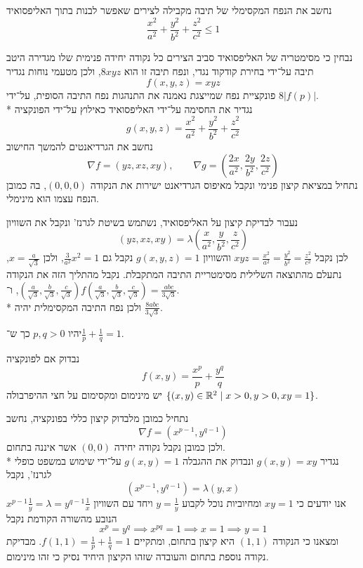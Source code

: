 \Question{}
נחשב את הנפח המקסימלי של תיבה מקבילה לצירים שאפשר לבנות בתוך האליפסואיד
\[
	\frac{x^2}{a^2} + \frac{y^2}{b^2} + \frac{z^2}{c^2} \le 1
\]

נבחין כי מסימטריה של האליפסואיד סביב הצירים כל נקודה יחידה פנימית שלו מגדירה היטב תיבה על־ידי בחירת קודקוד נגדי, ונפח תיבה זו הוא $8xyz$, ולכן מטעמי נוחות נגדיר
\[
	f(x, y, z) = xyz
\]
פונקציית נפח שמייצגת נאמנה את התנהגות נפח התיבה הסופית, על־ידי $8|f(p)|$. \\*
נגדיר את החסימה על־ידי האליפסואיד כאילוץ על־ידי הפונקציה
\[
	g(x, y, z) = \frac{x^2}{a^2} + \frac{y^2}{b^2} + \frac{z^2}{c^2}
\]
נחשב את הגרדיאנטים להמשך החישוב
\[
	\nabla f = (yz, xz, xy),
	\qquad
	\nabla g = (\frac{2x}{a^2}, \frac{2y}{b^2}, \frac{2z}{c^2})
\]
נתחיל במציאת קיצון פנימי ונקבל מאיפוס הגרדיאנט ישירות את הנקודה $(0, 0, 0)$, בה כמובן הנפח עצמו הוא מינימלי.

נעבור לבדיקת קיצון על האליפסואיד, נשתמש בשיטת לגרנז' ונקבל את השוויון
\[
	(yz, xz, xy) = \lambda (\frac{x}{a^2}, \frac{y}{b^2}, \frac{z}{c^2})
\]
לכן נקבל $xyz = \frac{x^2}{a^2} = \frac{y^2}{b^2} = \frac{z^2}{c^2}$ והשוויון $g(x, y, z) = 1$ נקבל גם $\frac{3}{a^2} x^2 = 1$, ולכן $x = \frac{a}{\sqrt{3}}$, נתעלם מהתוצאה השלילית מסימטריית התיבה המתקבלת.
נקבל מהתליך הזה את הנקודה $(\frac{a}{\sqrt{3}},\frac{b}{\sqrt{3}}, \frac{c}{\sqrt{3}})$, ו־$f(\frac{a}{\sqrt{3}},\frac{b}{\sqrt{3}}, \frac{c}{\sqrt{3}}) = \frac{abc}{3 \sqrt{3}}$. \\*
ולכן נפח התיבה המקסימלית יהיה $\frac{8abc}{3 \sqrt{3}}$.

\Question{}
יהיו $p, q > 0$ כך ש־$\frac{1}{p} + \frac{1}{q} = 1$.

\Subquestion{}
נבדוק אם לפונקציה
\[
	f(x, y) = \frac{x^p}{p} + \frac{y^q}{q}
\]
יש מינימום ומקסימום על חצי ההיפרבולה $\{(x, y) \in \mathbb{R}^2 \mid x > 0, y > 0, xy = 1 \}$.

נתחיל כמובן מלבדוק קיצון כללי בפונקציה, נחשב
\[
	\nabla f = (x^{p - 1}, y^{q - 1})
\]
ולכן כמובן נקבל נקודה יחידה $(0, 0)$ אשר איננה בתחום. \\*
נגדיר $g(x, y) = xy$ ונבדוק את ההגבלה $g(x, y) = 1$ על־ידי שימוש במשפט כופלי לגרנז', נקבל
\[
	(x^{p - 1}, y^{q - 1}) = \lambda (y, x)
\]
אנו יודעים כי $xy = 1$ ומחיוביות נוכל לקבוע $y = \frac{1}{y}$ ויחד עם השוויון $x^{p - 1} \frac{1}{y} = \lambda = y^{q - 1} \frac{1}{x}$ הנובע מהשורה הקודמת נקבל
\[
	x^p = y^q \implies x^{pq} = 1 \implies x = 1 \implies y = 1
\]
ומצאנו כי הנקודה $(1, 1)$ היא קיצון בתחום, ומתקיים $f(1, 1) = \frac{1}{p} + \frac{1}{q} = 1$. מבדיקת נקודה נוספת בתחום והעובדה שזהו הקיצון היחיד נסיק כי זהו מינימום.

